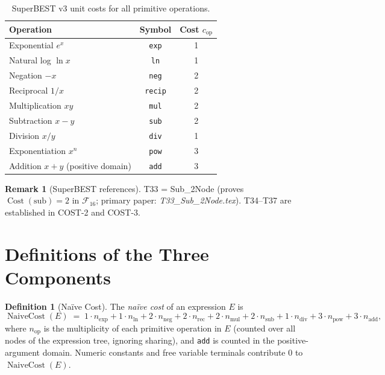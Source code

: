 \documentclass[12pt,a4paper]{article}
\theoremstyle{definition}
\newtheorem{definition}[theorem]{Definition}
\newtheorem{remark}[theorem]{Remark}
\newcommand{\Cost}{\operatorname{Cost}}
\newcommand{\NC}{\operatorname{NaiveCost}}
\begin{document}
\begin{table}[h]
\centering
\caption{SuperBEST v3 unit costs for all primitive operations.}
\label{tab:superbest3}
\smallskip
\begin{tabular}{@{}lcc@{}}
\toprule
\textbf{Operation} & \textbf{Symbol} & \textbf{Cost $c_{\mathrm{op}}$} \\
\midrule
Exponential $e^x$   & \texttt{exp}   & 1 \\
Natural log $\ln x$ & \texttt{ln}    & 1 \\
Negation $-x$       & \texttt{neg}   & 2 \\
Reciprocal $1/x$    & \texttt{recip} & 2 \\
Multiplication $xy$ & \texttt{mul}   & 2 \\
Subtraction $x-y$   & \texttt{sub}   & 2 \\
Division $x/y$      & \texttt{div}   & 1 \\
Exponentiation $x^n$& \texttt{pow}   & 3 \\
Addition $x+y$ (positive domain) & \texttt{add} & 3 \\
\bottomrule
\end{tabular}
\end{table}

\begin{remark}[SuperBEST references]
\label{rem:sbref}
T33 = Sub\_2Node (proves $\Cost(\text{sub}) = 2$ in $\mathcal{F}_{16}$;
primary paper: \textit{T33\_Sub\_2Node.tex}).
T34--T37 are established in COST-2 and COST-3.
\end{remark}

\section{Definitions of the Three Components}
\label{sec:definitions}

\begin{definition}[Na\"{i}ve Cost]
\label{def:NC}
The \emph{na\"{i}ve cost} of an expression $E$ is
\[
  \NC(E) \;=\;
    1 \cdot n_{\exp}
  + 1 \cdot n_{\ln}
  + 2 \cdot n_{\mathrm{neg}}
  + 2 \cdot n_{\mathrm{rec}}
  + 2 \cdot n_{\mathrm{mul}}
  + 2 \cdot n_{\mathrm{sub}}
  + 1 \cdot n_{\mathrm{div}}
  + 3 \cdot n_{\mathrm{pow}}
  + 3 \cdot n_{\mathrm{add}},
\]
where $n_{\mathrm{op}}$ is the multiplicity of each primitive operation
in $E$ (counted over all nodes of the expression tree, ignoring sharing),
and \texttt{add} is counted in the positive-argument domain.
Numeric constants and free variable terminals contribute 0 to $\NC(E)$.
\end{definition}
\end{document}
